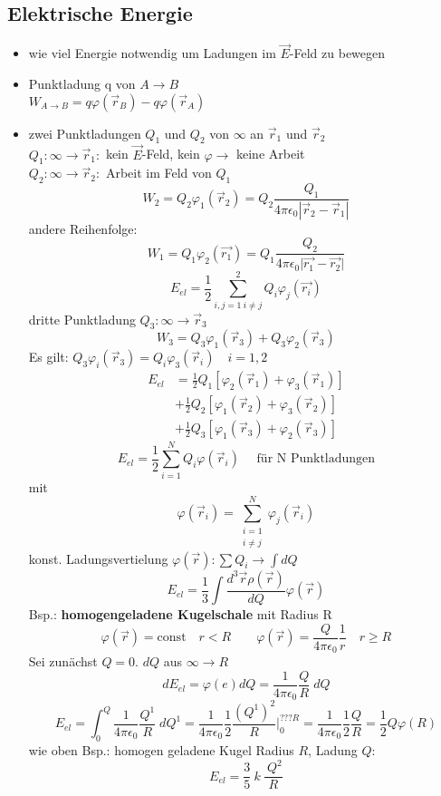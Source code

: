 \documentclass[titlepage,12pt,a4paper,ngerman]{report}
\newcommand{\tx}[1]{\textrm{#1}}
\begin{document}
\subsection{Elektrische Energie}
\begin{itemize}
\item wie viel Energie notwendig um Ladungen im $\vec{E}$-Feld zu bewegen
\item Punktladung q von $A \rightarrow B$\\
$ W_{A\rightarrow B}= q \varphi(\vec{r}_B) - q \varphi(\vec{r}_A)$
\item zwei Punktladungen $Q_1$ und $Q_2$ von $\infty$ an $\vec{r}_1$ und $\vec{r}_2$\\
$Q_1: \infty \rightarrow \vec{r}_1:$ kein $\vec{E}$-Feld, kein $\varphi \rightarrow$ keine Arbeit\\
$Q_2: \infty \rightarrow \vec{r}_2:$ Arbeit im Feld von $Q_1$\\
$$W_2 = Q_2 \varphi_1(\vec{r}_2) = Q_2 \frac{Q_1}{4\pi\epsilon_0 |\vec{r}_2 - \vec{r}_1|}$$ 
andere Reihenfolge: $$W_1 = Q_1 \varphi_2 (\vec{r_1}) = Q_1 \frac{Q_2}{4 \pi \epsilon_0  \vert \vec{r_1} - \vec{r_2}\vert }$$
$$E_{el} = \frac{1}{2} \sum_{i,j=1 \ i\neq j}^{2}Q_i \varphi_j(\vec{r_i})$$
dritte Punktladung $Q_3 : \infty \rightarrow \vec{r}_3$\\
$$W_3 = Q_3 \varphi_1(\vec{r}_3) + Q_3 \varphi_2(\vec{r}_3)$$
Es gilt: $Q_3 \varphi_i(\vec{r}_3) = Q_i \varphi_3(\vec{r}_i) \quad i = 1,2$
\begin{align*}
E_{el} &= \frac{1}{2} Q_1 [\varphi_2(\vec{r}_1) + \varphi_3(\vec{r}_1)] \\
& + \frac{1}{2} Q_2 [\varphi_1(\vec{r}_2) + \varphi_3(\vec{r}_2)] \\
& + \frac{1}{2} Q_3 [\varphi_1(\vec{r}_3) + \varphi_2(\vec{r}_3)]
\end{align*}
$$E_{el} = \frac{1}{2} \sum_{i=1}^N Q_i \varphi(\vec{r}_i) \quad \tx{ für N Punktladungen}$$
mit $$\varphi(\vec{r}_i) = \sum^N_{\substack{ i=1 \\ i \neq j }} \varphi_j(\vec{r}_i)$$
konst. Ladungsvertielung $\varphi(\vec{r}) : \sum Q_i \rightarrow \int dQ$
$$E_{el}= \frac{1}{3} \int \frac{d^3\vec{r} \rho (\vec{r})}{dQ} \varphi(\vec{r})$$
Bsp.: \textbf{homogengeladene Kugelschale} mit Radius R
$$\varphi(\vec{r}) = \tx{const} \quad  r<R \qquad \varphi(\vec{r})= \frac{Q}{4\pi\epsilon_0} \frac{1}{r} \quad r\ge R$$
Sei zunächst $Q = 0$. $dQ$ aus $\infty \rightarrow R$\\
$$dE_{el}= \varphi(e) dQ = \frac{1}{4\pi\epsilon_0} \frac{Q}{R} \; dQ$$
$$E_{el}= \int^Q_0 \frac{1}{4\pi\epsilon_0} \frac{Q^1}{R} \; dQ^1 = \frac{1}{4\pi\epsilon_0} \frac{1}{2} \frac{(Q^{1})^2}{R} \bigg\vert_0^{???R} = \frac{1}{4\pi\epsilon_0} \frac{1}{2} \frac{Q}{R} = \frac{1}{2} Q \varphi(R)$$ wie oben
Bsp.: homogen geladene Kugel Radius $R$, Ladung $Q$:
$$E_{el} = \frac{3}{5}\ k\ \frac{\ Q^2}{R}$$
\end{itemize}
\end{document}
